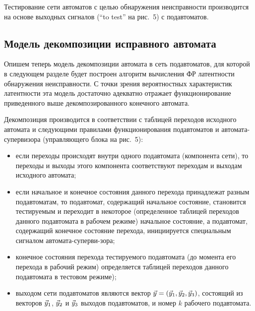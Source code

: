 \begin{multicols}{2}
Тестирование сети автоматов с целью обнаружения неисправности производится
на основе выходных сигналов (``to test'' на рис.~5) с подавтоматов.


\vspace*{6pt}
\subsection{Модель декомпозиции исправного автомата}

\vspace*{2pt}

Опишем теперь модель декомпозиции автомата в сеть подавтоматов, для
которой в следующем разделе будет построен алгоритм вычисления ФР
латентности обнаружения неисправности.
С точки зрения вероятностных характеристик латентности эта модель достаточно
адекватно отражает функционирование приведенного выше декомпозированного
конечного автомата.

Декомпозиция производится в соответствии с таблицей переходов исходного
автомата и сле\-ду\-ющи\-ми правилами функционирования подавтоматов и
автомата-супервизора (управляющего блока на рис.~5):\\[-9pt]
\begin{itemize}
\item
если переходы происходят внутри одного под\-ав\-то\-ма\-та (компонента сети), то
переходы и выходы этого компонента соответствуют переходам и выходам
исходного автомата;\\[-9pt]
\item
если начальное и конечное состояния данного перехода принадлежат разным
подавтоматам, то подавтомат, содержащий начальное состояние, становится
тестируемым и переходит в некоторое (определенное таблицей переходов
данного подавтомата в рабочем режиме) начальное состояние, а подавтомат,
содержащий конечное состояние перехода, инициируется специальным сигналом
автомата-суперви-\linebreak зора;
\item
конечное состояния перехода тестируемого под\-ав\-то\-ма\-та (до момента его
перехода в рабочий режим) определяется таблицей переходов данного
подавтомата в тестовом режиме);\\[-9pt]
\item
выходом сети подавтоматов являются вектор $\vec y=(\vec y_1,\vec y_2,\vec y_3)$,
состоящий из векторов $\vec y_1$, $\vec y_2$ и $\vec y_3$ выходов подавтоматов,
и номер $k$ рабочего подавтомата.\\[-9pt]
\end{itemize}


\end{multicols}
